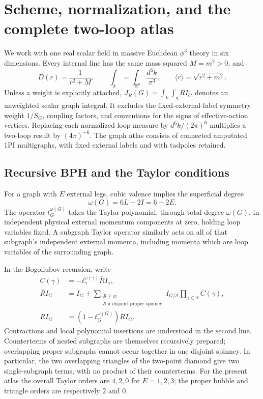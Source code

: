 \section{Scheme, normalization, and the complete two-loop atlas}
\label{sec:scheme}

We work with one real scalar field in massive Euclidean $\phi^3$ theory in
six dimensions. Every internal line has the same mass squared $M=m^2>0$,
and
\[
 D(r)=\frac{1}{r^2+M},\qquad
 \int_k=\int_{\mathbb R^6}\frac{d^6k}{\pi^3},\qquad
 \langle r\rangle=\sqrt{r^2+m^2}.
\]
Unless a weight is explicitly attached, $J_R(G)=\int_k\int_q RI_G$
denotes an unweighted scalar graph integral. It excludes the fixed-external-label
symmetry weight $1/S_G$, coupling factors, and conventions for the signs of
effective-action vertices. Replacing each normalized loop measure by
$d^6k/(2\pi)^6$ multiplies a two-loop result by $(4\pi)^{-6}$.
The graph atlas consists of connected amputated 1PI multigraphs, with fixed
external labels and with tadpoles retained.

\subsection{Recursive BPH and the Taylor conditions}

For a graph with $E$ external legs, cubic valence implies the superficial
degree
\[
 \omega(G)=6L-2I=6-2E.
\]
The operator $t_G^{\omega(G)}$ takes the Taylor polynomial, through total
degree $\omega(G)$, in independent physical external momentum components
at zero, holding loop variables fixed. A subgraph Taylor operator similarly
acts on all of that subgraph's independent external momenta, including
momenta which are loop variables of the surrounding graph.

In the Bogoliubov recursion, write
\begin{align*}
 C(\gamma)&=-t_\gamma^{\omega(\gamma)}\overline R I_\gamma,\\
 \overline R I_G&=I_G+
 \sum_{\substack{\mathcal S\ne\varnothing\\
                 \mathcal S\text{ a disjoint proper spinney}}}
 I_{G/\mathcal S}\prod_{\gamma\in\mathcal S} C(\gamma),\\
 RI_G&=(1-t_G^{\omega(G)})\overline R I_G.
\end{align*}
Contractions and local polynomial insertions are understood in the second
line. Counterterms of nested subgraphs are themselves recursively prepared;
overlapping proper subgraphs cannot occur together in one disjoint spinney.
In particular, the two overlapping triangles of the two-point diamond give
two single-subgraph terms, with no product of their counterterms.
For the present atlas the overall Taylor orders are $4,2,0$ for $E=1,2,3$;
the proper bubble and triangle orders are respectively $2$ and $0$.

